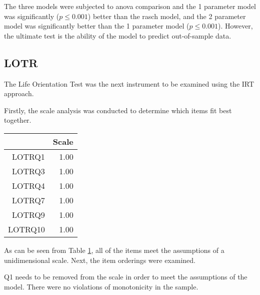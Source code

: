 \documentclass{article}
\begin{document}
The three models were subjected to anova comparison and the 1 parameter model was significantly ($p \le 0.001$) better than the rasch model, and the 2 parameter model was significantly better than the 1 parameter model ($p \le 0.001$). However, the ultimate test is the ability of the model to predict out-of-sample data. 

\subsection{LOTR}
\label{sec:lotr}



The Life Orientation Test was the next instrument to be examined using the IRT approach.

Firstly, the scale analysis was conducted to determine which items fit best together.

\begin{table}[ht]
\centering
\begin{tabular}{rr}
  \hline
 & Scale \\ 
  \hline
LOTRQ1 & 1.00 \\ 
  LOTRQ3 & 1.00 \\ 
  LOTRQ4 & 1.00 \\ 
  LOTRQ7 & 1.00 \\ 
  LOTRQ9 & 1.00 \\ 
  LOTRQ10 & 1.00 \\ 
   \hline
\end{tabular}
\label{tab:lotrscales}
\end{table}
As can be seen from Table \ref{tab:lotrscales}, all of the items meet the assumptions of a unidimensional scale.  Next, the item orderings were examined.



Q1 needs to be removed from the scale in order to meet the assumptions of the model. There were no violations of monotonicity in the sample.
\end{document}
